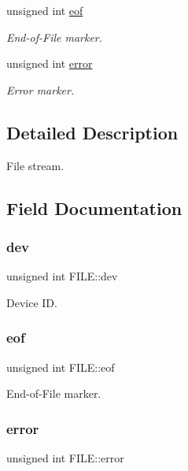 \begin{DoxyCompactItemize}
unsigned int \hyperlink{structFILE_a0cb84690a663b39c7a870e6946b163c6}{eof}
\begin{DoxyCompactList}\small\item\em End-\/of-\/\+File marker. \end{DoxyCompactList}\item 
unsigned int \hyperlink{structFILE_a175509e10e7b35406f98d4a818879e8a}{error}
\begin{DoxyCompactList}\small\item\em Error marker. \end{DoxyCompactList}\end{DoxyCompactItemize}


\subsection{Detailed Description}
File stream. 

\subsection{Field Documentation}
\mbox{\label{structFILE_ae0766e84f084e6297ae04c869bd06974}} 
\subsubsection{\texorpdfstring{dev}{dev}}
{\footnotesize\ttfamily unsigned int F\+I\+L\+E\+::dev}



Device ID. 

\mbox{\label{structFILE_a0cb84690a663b39c7a870e6946b163c6}} 
\subsubsection{\texorpdfstring{eof}{eof}}
{\footnotesize\ttfamily unsigned int F\+I\+L\+E\+::eof}



End-\/of-\/\+File marker. 

\mbox{\label{structFILE_a175509e10e7b35406f98d4a818879e8a}} 
\subsubsection{\texorpdfstring{error}{error}}
{\footnotesize\ttfamily unsigned int F\+I\+L\+E\+::error}



